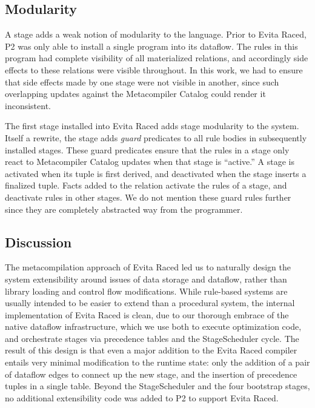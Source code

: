 % 



\subsection{Modularity}
\label{ch:evita:sec:modularity}

A stage adds a weak notion of modularity to the \OVERLOG language.  Prior to
Evita Raced, P2 was only able to install a single \OVERLOG program into its
dataflow.  The rules in this program had complete visibility of all
materialized relations, and accordingly side effects to these relations were
visible throughout.  In this work, we had to ensure that side effects made by
one stage were not visible in another, since such overlapping updates against
the Metacompiler Catalog could render it inconsistent.

The first \OVERLOG stage installed into Evita Raced adds stage modularity to
the system.  Itself a rewrite, the stage adds {\em guard} predicates to all
rule bodies in subsequently installed \OVERLOG stages.  These guard predicates
ensure that the rules in a stage only react to Metacompiler Catalog updates
when that stage is ``active.'' A stage is activated when its
 tuple is first derived, and deactivated when the
stage inserts a finalized  tuple.  Facts added to the 
relation activate the rules of a stage, and deactivate rules in other stages.
We do not mention these guard rules further since they are completely
abstracted way from the programmer.

\subsection{Discussion}

The metacompilation approach of Evita Raced led us to naturally design the
system extensibility around issues of data storage and dataflow, rather than
library loading and control flow modifications.  While rule-based systems are
usually intended to be easier to extend than a procedural system, the internal
implementation of Evita Raced is clean, due to our thorough embrace of the
native dataflow infrastructure, which we use both to execute optimization code,
and orchestrate stages via precedence tables and the StageScheduler cycle.  The
result of this design is that even a major addition to the Evita Raced compiler
entails very minimal modification to the runtime state: only the addition of a
pair of dataflow edges to connect up the new stage, and the insertion of
precedence tuples in a single table.  Beyond the StageScheduler and the four
bootstrap stages, no additional extensibility code was added to P2 to support
Evita Raced.

